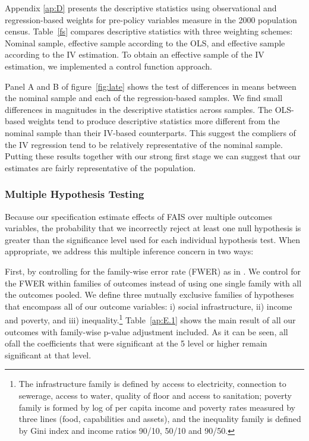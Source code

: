\documentclass[dv_diss_main.tex]{subfiles}
\begin{document}
Appendix \ref{ap:D} presents the descriptive statistics using observational and regression-based weights for pre-policy variables measure in the 2000 population census. {Table}~\ref{fs} compares descriptive statistics with three weighting schemes: Nominal sample, effective sample according to the OLS, and effective sample according to the IV estimation. To obtain an effective sample of the IV estimation, we implemented a control function approach. 

Panel A and B of {figure}~\ref{fig:late} shows the test of differences in means between the nominal sample and each of the regression-based samples. We find small differences in magnitudes in the descriptive statistics across samples. The OLS-based weights tend to produce descriptive statistics more different from the nominal sample than their IV-based counterparts. This suggest the compliers of the IV regression tend to be relatively representative of the nominal sample. Putting these results together with our strong first stage we can suggest that our estimates are fairly representative of the population. 

\subsubsection{Multiple Hypothesis Testing} Because our specification estimate effects of FAIS over multiple outcomes variables, the probability that we incorrectly reject at least one null hypothesis is greater than the significance level used for each individual hypothesis test. When appropriate, we address this multiple inference concern in two ways:

 First, by controlling for the family-wise error rate (FWER) as in \cite{jones2019workplace}. We control for the FWER within families of outcomes instead of using one single family with all the outcomes pooled. We define three mutually exclusive families of hypotheses that encompass all of our outcome variables: i) social infrastructure, ii) income and poverty, and iii) inequality.\footnote{The infrastructure family is defined by access to electricity, connection to sewerage, access to water, quality of floor and access to sanitation; poverty family is formed by log of per capita income and poverty rates measured by three lines (food, capabilities and assets), and the inequality family is defined by Gini index and income ratios 90/10, 50/10 and 90/50.}  Table~\ref{ap:E.1} shows the main result of all our outcomes with family-wise p-value adjustment included. As it can be seen, all ofall the coefficients that were significant at the 5 level or higher remain significant at that level.  
\end{document}
